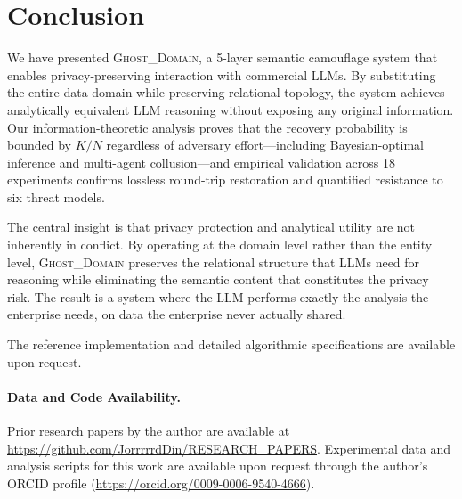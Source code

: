\documentclass[11pt]{article}
\begin{document}
\section{Conclusion}

We have presented \textsc{Ghost\_Domain}, a 5-layer semantic camouflage system that enables privacy-preserving interaction with commercial LLMs. By substituting the entire data domain while preserving relational topology, the system achieves analytically equivalent LLM reasoning without exposing any original information. Our information-theoretic analysis proves that the recovery probability is bounded by $K/N$ regardless of adversary effort---including Bayesian-optimal inference and multi-agent collusion---and empirical validation across 18 experiments confirms lossless round-trip restoration and quantified resistance to six threat models.

The central insight is that privacy protection and analytical utility are not inherently in conflict. By operating at the domain level rather than the entity level, \textsc{Ghost\_Domain} preserves the relational structure that LLMs need for reasoning while eliminating the semantic content that constitutes the privacy risk. The result is a system where the LLM performs exactly the analysis the enterprise needs, on data the enterprise never actually shared.

The reference implementation and detailed algorithmic specifications are available upon request.

\paragraph{Data and Code Availability.}
Prior research papers by the author are available at \url{https://github.com/JorrrrrdDin/RESEARCH_PAPERS}. Experimental data and analysis scripts for this work are available upon request through the author's ORCID profile (\url{https://orcid.org/0009-0006-9540-4666}).



\end{document}
